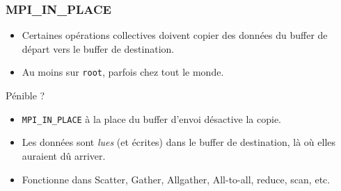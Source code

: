 \documentclass[xcolor={x11names,svgnames}]{beamer}
\begin{document}

\begin{frame}[fragile]
\frametitle{MPI\_IN\_PLACE}

\begin{itemize}
\item Certaines opérations collectives doivent copier des données du buffer
  de départ vers le buffer de destination.

\item Au moins sur \texttt{root}, parfois chez tout le monde.
\end{itemize}

\begin{alertblock}{Pénible ?}
\begin{itemize}
\item \verb|MPI_IN_PLACE| à la place du buffer d'envoi désactive la copie.

\item Les données sont \emph{lues} (et écrites) dans le buffer de destination, là
  où elles auraient dû arriver. 

\item Fonctionne dans Scatter, Gather, Allgather, All-to-all, reduce, scan, etc.
\end{itemize}
\end{alertblock}
\end{frame}

\end{document}
